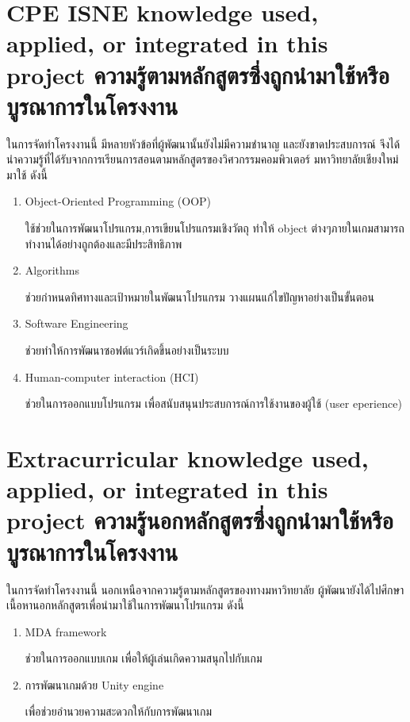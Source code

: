 
\section{\ifenglish%
\ifcpe CPE \else ISNE \fi knowledge used, applied, or integrated in this project
\else%
ความรู้ตามหลักสูตรซึ่งถูกนำมาใช้หรือบูรณาการในโครงงาน\fi}

\qquad ในการจัดทำโครงงานนี้ มีหลายหัวข้อที่ผู้พัฒนานั้นยังไม่มีความชำนาญ และยังขาดประสบการณ์ 
จึงได้นำความรู้ที่ได้รับจากการเรียนการสอนตามหลักสูตรของวิศวกรรมคอมพิวเตอร์ มหาวิทยาลัยเชียงใหม่มาใช้ ดังนี้
\begin{enumerate}
  \item Object-Oriented Programming (OOP)
  
  \qquad ใช้ช่วยในการพัฒนาโปรแกรม,การเขียนโปรแกรมเชิงวัตถุ ทำให้ object ต่างๆภายในเกมสามารถทำงานได้อย่างถูกต้องและมีประสิทธิภาพ
  \item Algorithms
  
  \qquad ช่วยกำหนดทิศทางและเป้าหมายในพัฒนาโปรแกรม วางแผนแก้ไขปัญหาอย่างเป็นขั้นตอน
  \item Software Engineering
  
  \qquad ช่วยทำให้การพัฒนาซอฟต์แวร์เกิดขึ้นอย่างเป็นระบบ
  \item Human-computer interaction (HCI) 
  
  \qquad ช่วยในการออกแบบโปรแกรม เพื่อสนับสนุนประสบการณ์การใช้งานของผู้ใช้ (user eperience)
\end{enumerate}

\section{\ifenglish%
Extracurricular knowledge used, applied, or integrated in this project
\else%
ความรู้นอกหลักสูตรซึ่งถูกนำมาใช้หรือบูรณาการในโครงงาน\fi}

\qquad ในการจัดทำโครงงานนี้ นอกเหนือจากความรู้ตามหลักสูตรของทางมหาวิทยาลัย ผู้พัฒนายังได้ไปศึกษาเนื้อหานอกหลักสูตรเพื่อนำมาใช้ในการพัฒนาโปรแกรม ดังนี้

\begin{enumerate}
  \item MDA framework 
  
  \qquad ช่วยในการออกแบบเกม เพื่อให้ผู้เล่นเกิดความสนุกไปกับเกม
  \item การพัฒนาเกมด้วย Unity engine
  
  \qquad เพื่อช่วยอำนวยความสะดวกให้กับการพัฒนาเกม
\end{enumerate}
